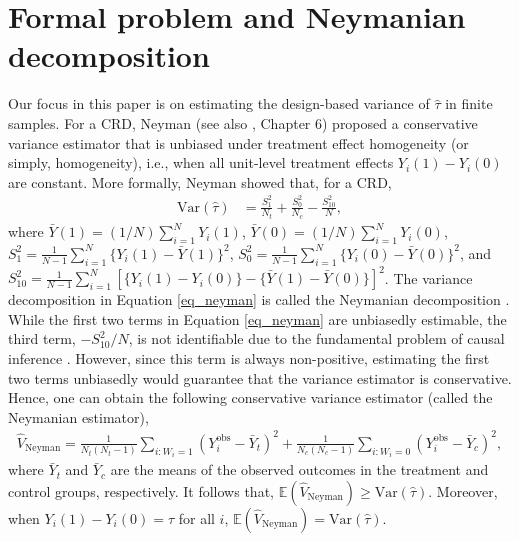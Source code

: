\documentclass[12pt]{article}
\newcommand{\Var}{{\text{Var}}}
\newcommand{\E}{{\mathbb{E}}}
\begin{document}
\section{Formal problem and Neymanian decomposition}
\label{sec_measurable}
\label{sec_neyman_decomposition}
Our focus in this paper is on estimating the design-based variance of $\hat{\tau}$ in finite samples. 
For a CRD, Neyman \cite{neyman1923application} (see also \cite{imbens2015causal}, Chapter 6) proposed a conservative variance estimator that is unbiased under treatment effect homogeneity (or simply, homogeneity), i.e., when all unit-level treatment effects $Y_i(1)-Y_i(0)$ are constant. 
More formally, Neyman showed that, for a CRD,
\begin{align}
    \Var(\hat{\tau}) &= \frac{S^2_1}{N_t}+ \frac{S^2_0}{N_c}  - \frac{S^2_{10}}{N}, \label{eq_neyman}
\end{align}
where $\bar{Y}(1) = (1/N)\sum_{i=1}^{N}Y_i(1)$, $\bar{Y}(0) = (1/N)\sum_{i=1}^{N}Y_i(0)$, $S^2_1 = \frac{1}{N-1}\sum_{i=1}^{N}\{Y_i(1) -\bar{Y}(1)\}^2 $, $S^2_0 = \frac{1}{N-1}\sum_{i=1}^{N}\{Y_i(0) -\bar{Y}(0)\}^2 $, and $S^2_{10} = \frac{1}{N-1}\sum_{i=1}^{N}[\{Y_i(1)-Y_i(0)\} -\{\bar{Y}(1) - \bar{Y}(0)\}]^2$.  The variance decomposition in Equation \ref{eq_neyman} is called the Neymanian decomposition \cite{mukerjee2018using}.
While the first two terms in Equation \ref{eq_neyman} are unbiasedly estimable, the third term, $-S^2_{10}/N$, is not identifiable due to the fundamental problem of causal inference \cite{holland1986statistics}. However, since this term is always non-positive, estimating the first two terms unbiasedly would guarantee that the variance estimator is conservative. Hence, one can obtain the following conservative variance estimator (called the Neymanian estimator),
\begin{align}
    \hat{V}_{\text{Neyman}} = \frac{1}{N_t(N_t-1)}\sum_{i:W_i=1}(Y^{\text{obs}}_i -\bar{Y}_t)^2 + \frac{1}{N_c(N_c-1)}\sum_{i:W_i = 0}(Y^{\text{obs}}_i -\bar{Y}_c)^2,
\end{align}
where $\bar{Y}_t$ and $\bar{Y}_c$ are the means of the observed outcomes in the treatment and control groups, respectively. It follows that, $\E(\hat{V}_{\text{Neyman}}) \geq \Var(\hat{\tau})$. Moreover, when $Y_i(1) - Y_i(0) = \tau$ for all $i$, $\E(\hat{V}_{\text{Neyman}}) = \Var(\hat{\tau})$.
\end{document}
